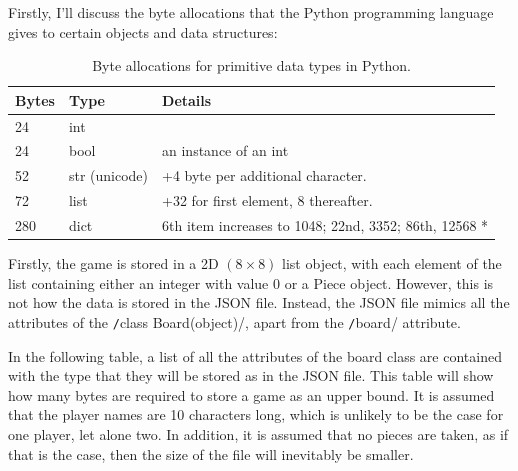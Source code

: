 \documentclass[twoside, 12pt]{report}
\begin{document}
Firstly, I'll discuss the byte allocations that the Python programming language gives to certain objects and data structures:
\begin{table}[H]
\centering
	\begin{tabular}{| l | l | l |}
		\hline
		\textbf{Bytes} & \textbf{Type} & \textbf{Details} \\ \hline
		24 & int & \\ \hline
		24 & bool & an instance of an int\\ \hline
		52 & str (unicode) & +4 byte per additional character. \\ \hline
		72 & list & +32 for first element, 8 thereafter. \\ \hline
		280 & dict & 6th item increases to 1048; 22nd, 3352; 86th, 12568 * \\ \hline
	\end{tabular}
	\caption{Byte allocations for primitive data types in Python.}
\end{table}
Firstly, the game is stored in a 2D $ (8\times8) $ list object, with each element of the list containing either an integer with value 0 or a Piece object. However, this is not how the data is stored in the JSON file. Instead, the JSON file mimics all the attributes of the \texttt/class Board(object)/, apart from the \texttt/board/ attribute.

In the following table, a list of all the attributes of the board class are contained with the type that they will be stored as in the JSON file. This table will show how many bytes are required to store a game as an upper bound. It is assumed that the player names are 10 characters long, which is unlikely to be the case for one player, let alone two. In addition, it is assumed that no pieces are taken, as if that is the case, then the size of the file will inevitably be smaller.
\end{document}
